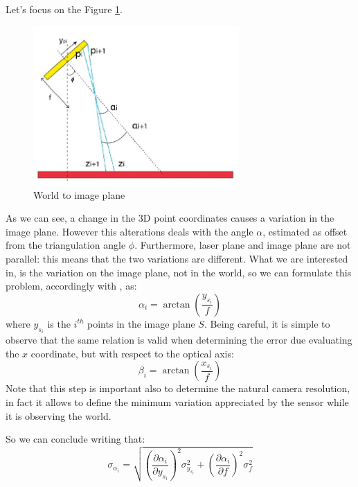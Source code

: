 Let's focus on the Figure \ref{fig:laser-triang-a}.
  \begin{figure}[t!]
    \centering
    \includegraphics[width=0.7\textwidth]{./images/model/laser_triang_alpha.png}
    \caption{World to image plane}
    \label{fig:laser-triang-a}
  \end{figure}
As we can see, a change in the 3D point coordinates causes a variation in the image plane. However this alterations deals with the angle $\alpha$, estimated as offset from the triangulation angle $\phi$. Furthermore, laser plane and image plane are not parallel: this means that the two variations are different. What we are interested in, is the variation on the image plane, not in the world, so we can formulate this problem, accordingly with \cite{th:quattrini}, as:
  \begin{equation}
  	\alpha_i = \arctan\left( \frac{y_{s_i}}{f} \right)
    \label{eq:model:alpha}
  \end{equation}
where $y_{s_i}$ is the $i^{th}$ points in the image plane $S$. Being careful, it is simple to observe that the same relation is valid when determining the error due evaluating the $x$ coordinate, but with respect to the optical axis:
  \begin{equation*}
  	\beta_i = \arctan\left( \frac{x_{s_i}}{f} \right)
  \end{equation*}
Note that this step is important also to determine the natural camera resolution, in fact it allows to define the minimum variation appreciated by the sensor while it is observing the world.

So we can conclude writing that:
  \begin{equation}
    \label{eq:det_a}
  	\sigma_{\alpha_i} = \sqrt{
  	  \left( \frac{\partial \alpha_i}{\partial y_{s_i}} \right)^2 \sigma_{y_{s_i}}^2
  	  + \left( \frac{\partial \alpha_i}{\partial f} \right)^2 \sigma_f^2
  	}
  \end{equation} \\

